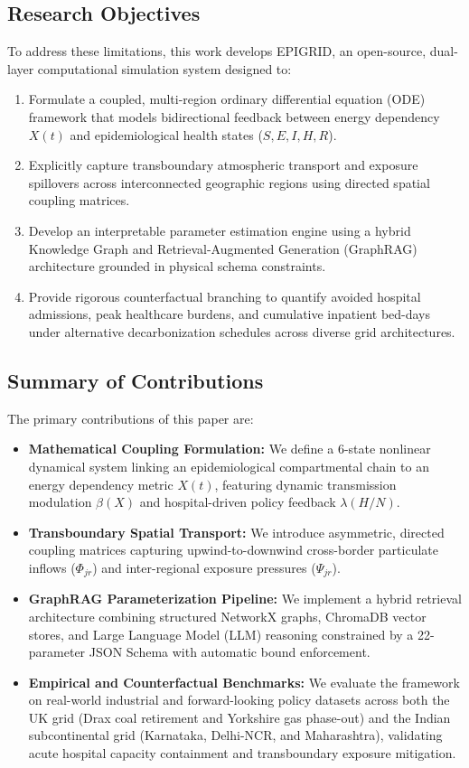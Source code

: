 \documentclass[conference]{IEEEtran}
\renewcommand{\_}{\textunderscore\allowbreak{}}%
\begin{document}
\subsection{Research Objectives}
To address these limitations, this work develops EPIGRID, an open-source, dual-layer computational simulation system designed to:
\begin{enumerate}
    \item Formulate a coupled, multi-region ordinary differential equation (ODE) framework that models bidirectional feedback between energy dependency $X(t)$ and epidemiological health states ($S, E, I, H, R$).
    \item Explicitly capture transboundary atmospheric transport and exposure spillovers across interconnected geographic regions using directed spatial coupling matrices.
    \item Develop an interpretable parameter estimation engine using a hybrid Knowledge Graph and Retrieval-Augmented Generation (GraphRAG) architecture grounded in physical schema constraints.
    \item Provide rigorous counterfactual branching to quantify avoided hospital admissions, peak healthcare burdens, and cumulative inpatient bed-days under alternative decarbonization schedules across diverse grid architectures.
\end{enumerate}

\subsection{Summary of Contributions}
The primary contributions of this paper are:
\begin{itemize}
    \item \textbf{Mathematical Coupling Formulation:} We define a 6-state nonlinear dynamical system linking an epidemiological compartmental chain to an energy dependency metric $X(t)$, featuring dynamic transmission modulation $\beta(X)$ and hospital-driven policy feedback $\lambda(H/N)$.
    \item \textbf{Transboundary Spatial Transport:} We introduce asymmetric, directed coupling matrices capturing upwind-to-downwind cross-border particulate inflows ($\Phi_{jr}$) and inter-regional exposure pressures ($\Psi_{jr}$).
    \item \textbf{GraphRAG Parameterization Pipeline:} We implement a hybrid retrieval architecture combining structured NetworkX graphs, ChromaDB vector stores, and Large Language Model (LLM) reasoning constrained by a 22-parameter JSON Schema with automatic bound enforcement.
    \item \textbf{Empirical and Counterfactual Benchmarks:} We evaluate the framework on real-world industrial and forward-looking policy datasets across both the UK grid (Drax coal retirement and Yorkshire gas phase-out) and the Indian subcontinental grid (Karnataka, Delhi-NCR, and Maharashtra), validating acute hospital capacity containment and transboundary exposure mitigation.
\end{itemize}
\end{document}
